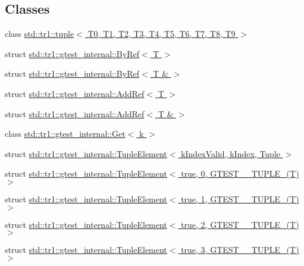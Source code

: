 \subsection*{Classes}
\begin{DoxyCompactItemize}
\item 
class \hyperlink{classstd_1_1tr1_1_1tuple}{std\-::tr1\-::tuple$<$ T0, T1, T2, T3, T4, T5, T6, T7, T8, T9 $>$}
\item 
struct \hyperlink{structstd_1_1tr1_1_1gtest__internal_1_1_by_ref}{std\-::tr1\-::gtest\-\_\-internal\-::\-By\-Ref$<$ T $>$}
\item 
struct \hyperlink{structstd_1_1tr1_1_1gtest__internal_1_1_by_ref_3_01_t_01_6_01_4}{std\-::tr1\-::gtest\-\_\-internal\-::\-By\-Ref$<$ T \& $>$}
\item 
struct \hyperlink{structstd_1_1tr1_1_1gtest__internal_1_1_add_ref}{std\-::tr1\-::gtest\-\_\-internal\-::\-Add\-Ref$<$ T $>$}
\item 
struct \hyperlink{structstd_1_1tr1_1_1gtest__internal_1_1_add_ref_3_01_t_01_6_01_4}{std\-::tr1\-::gtest\-\_\-internal\-::\-Add\-Ref$<$ T \& $>$}
\item 
class \hyperlink{classstd_1_1tr1_1_1gtest__internal_1_1_get}{std\-::tr1\-::gtest\-\_\-internal\-::\-Get$<$ k $>$}
\item 
struct \hyperlink{structstd_1_1tr1_1_1gtest__internal_1_1_tuple_element}{std\-::tr1\-::gtest\-\_\-internal\-::\-Tuple\-Element$<$ k\-Index\-Valid, k\-Index, Tuple $>$}
\item 
struct \hyperlink{structstd_1_1tr1_1_1gtest__internal_1_1_tuple_element_3_01true_00_010_00_01_g_t_e_s_t__10___t_u_p_l_e___07_t_08_01_4}{std\-::tr1\-::gtest\-\_\-internal\-::\-Tuple\-Element$<$ true, 0, G\-T\-E\-S\-T\-\_\-\_\-\-T\-U\-P\-L\-E\-\_\-(\-T) $>$}
\item 
struct \hyperlink{structstd_1_1tr1_1_1gtest__internal_1_1_tuple_element_3_01true_00_011_00_01_g_t_e_s_t__10___t_u_p_l_e___07_t_08_01_4}{std\-::tr1\-::gtest\-\_\-internal\-::\-Tuple\-Element$<$ true, 1, G\-T\-E\-S\-T\-\_\-\_\-\-T\-U\-P\-L\-E\-\_\-(\-T) $>$}
\item 
struct \hyperlink{structstd_1_1tr1_1_1gtest__internal_1_1_tuple_element_3_01true_00_012_00_01_g_t_e_s_t__10___t_u_p_l_e___07_t_08_01_4}{std\-::tr1\-::gtest\-\_\-internal\-::\-Tuple\-Element$<$ true, 2, G\-T\-E\-S\-T\-\_\-\_\-\-T\-U\-P\-L\-E\-\_\-(\-T) $>$}
\item 
struct \hyperlink{structstd_1_1tr1_1_1gtest__internal_1_1_tuple_element_3_01true_00_013_00_01_g_t_e_s_t__10___t_u_p_l_e___07_t_08_01_4}{std\-::tr1\-::gtest\-\_\-internal\-::\-Tuple\-Element$<$ true, 3, G\-T\-E\-S\-T\-\_\-\_\-\-T\-U\-P\-L\-E\-\_\-(\-T) $>$}

\end{DoxyCompactItemize}
